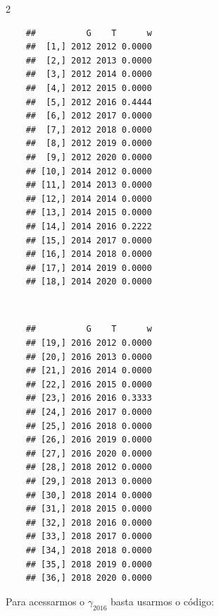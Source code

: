\documentclass[portugues]{article}
\newenvironment{Shaded}{\begin{snugshade}}{\end{snugshade}}
\newcommand{\AttributeTok}[1]{\textcolor[rgb]{0.13,0.29,0.53}{#1}}
\newcommand{\CommentTok}[1]{\textcolor[rgb]{0.56,0.35,0.01}{\textit{#1}}}
\newcommand{\DecValTok}[1]{\textcolor[rgb]{0.00,0.00,0.81}{#1}}
\newcommand{\FunctionTok}[1]{\textcolor[rgb]{0.13,0.29,0.53}{\textbf{#1}}}
\newcommand{\NormalTok}[1]{#1}
\newcommand{\OtherTok}[1]{\textcolor[rgb]{0.56,0.35,0.01}{#1}}
\newcommand{\SpecialCharTok}[1]{\textcolor[rgb]{0.81,0.36,0.00}{\textbf{#1}}}
\begin{document}
\begin{box_code}
\begin{Shaded}
\end{Shaded}

\begin{multicols}{2}
    \centering
    \begin{verbatim}
    ##          G    T      w
    ##  [1,] 2012 2012 0.0000
    ##  [2,] 2012 2013 0.0000
    ##  [3,] 2012 2014 0.0000
    ##  [4,] 2012 2015 0.0000
    ##  [5,] 2012 2016 0.4444
    ##  [6,] 2012 2017 0.0000
    ##  [7,] 2012 2018 0.0000
    ##  [8,] 2012 2019 0.0000
    ##  [9,] 2012 2020 0.0000
    ## [10,] 2014 2012 0.0000
    ## [11,] 2014 2013 0.0000
    ## [12,] 2014 2014 0.0000
    ## [13,] 2014 2015 0.0000
    ## [14,] 2014 2016 0.2222
    ## [15,] 2014 2017 0.0000
    ## [16,] 2014 2018 0.0000
    ## [17,] 2014 2019 0.0000
    ## [18,] 2014 2020 0.0000
    \end{verbatim}
    \\
    \begin{verbatim}
    ##          G    T      w
    ## [19,] 2016 2012 0.0000
    ## [20,] 2016 2013 0.0000
    ## [21,] 2016 2014 0.0000
    ## [22,] 2016 2015 0.0000
    ## [23,] 2016 2016 0.3333
    ## [24,] 2016 2017 0.0000
    ## [25,] 2016 2018 0.0000
    ## [26,] 2016 2019 0.0000
    ## [27,] 2016 2020 0.0000
    ## [28,] 2018 2012 0.0000
    ## [29,] 2018 2013 0.0000
    ## [30,] 2018 2014 0.0000
    ## [31,] 2018 2015 0.0000
    ## [32,] 2018 2016 0.0000
    ## [33,] 2018 2017 0.0000
    ## [34,] 2018 2018 0.0000
    ## [35,] 2018 2019 0.0000
    ## [36,] 2018 2020 0.0000
    \end{verbatim}

\end{multicols}

Para acessarmos o $\gamma_{2016}$ basta usarmos o código: 

\begin{Shaded}
\end{Shaded}


\end{box_code}
\end{document}
